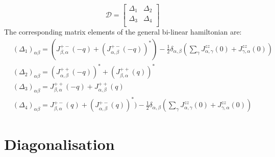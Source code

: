  \[
 \mathcal{D} =
\left[ {\begin{array}{cc}
	\Delta _1 & \Delta _2 \\
	\Delta _3 & \Delta _4 \\
	\end{array} } \right]
\]
The corresponding matrix elements of the general bi-linear hamiltonian are:
\begin{equation}
	\begin{split}
		&(\Delta _1)_{\alpha \beta} = (J^{+-}_{\beta,\alpha}(-q) + (J^{+-}_{\alpha,\beta}(-q))^*) - \frac{1}{2}\delta_{\alpha,\beta}(\sum_{\gamma}^{}J^{zz}_{\alpha,\gamma}(0) + J^{zz}_{\gamma,\alpha}(0)) \\
		&(\Delta _2)_{\alpha \beta} = (J_{\alpha,\beta}^{++}(-q))^* + (J_{\beta,\alpha}^{++}(q))^*\\
		&(\Delta _3)_{\alpha \beta} = J^{++}_{\beta,\alpha}(-q) + J^{++}_{\alpha, \beta}(q)\\
		&(\Delta _4)_{\alpha \beta} = J^{+-}_{\beta,\alpha}(q) + (J^{+-}_{\alpha,\beta}(q))^*) - \frac{1}{2}\delta_{\alpha,\beta}(\sum_{\gamma}^{}J^{zz}_{\alpha,\gamma}(0) + J^{zz}_{\gamma,\alpha}(0))
	\end{split}	
\end{equation}

\section{Diagonalisation}


\setcounter{equation}{0}
\setcounter{table}{0}
\setcounter{figure}{0}


    



